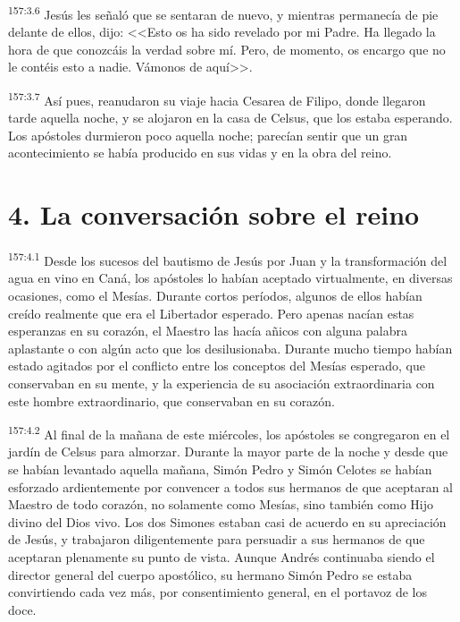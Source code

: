 \par 
\textsuperscript{157:3.6} Jesús les señaló que se sentaran de nuevo, y mientras permanecía de pie delante de ellos, dijo: <<Esto os ha sido revelado por mi Padre. Ha llegado la hora de que conozcáis la verdad sobre mí. Pero, de momento, os encargo que no le contéis esto a nadie. Vámonos de aquí>>.

\par 
\textsuperscript{157:3.7} Así pues, reanudaron su viaje hacia Cesarea de Filipo, donde llegaron tarde aquella noche, y se alojaron en la casa de Celsus, que los estaba esperando. Los apóstoles durmieron poco aquella noche; parecían sentir que un gran acontecimiento se había producido en sus vidas y en la obra del reino.

\section*{4. La conversación sobre el reino}
\par 
\textsuperscript{157:4.1} Desde los sucesos del bautismo de Jesús por Juan y la transformación del agua en vino en Caná, los apóstoles lo habían aceptado virtualmente, en diversas ocasiones, como el Mesías. Durante cortos períodos, algunos de ellos habían creído realmente que era el Libertador esperado. Pero apenas nacían estas esperanzas en su corazón, el Maestro las hacía añicos con alguna palabra aplastante o con algún acto que los desilusionaba. Durante mucho tiempo habían estado agitados por el conflicto entre los conceptos del Mesías esperado, que conservaban en su mente, y la experiencia de su asociación extraordinaria con este hombre extraordinario, que conservaban en su corazón.

\par 
\textsuperscript{157:4.2} Al final de la mañana de este miércoles, los apóstoles se congregaron en el jardín de Celsus para almorzar. Durante la mayor parte de la noche y desde que se habían levantado aquella mañana, Simón Pedro y Simón Celotes se habían esforzado ardientemente por convencer a todos sus hermanos de que aceptaran al Maestro de todo corazón, no solamente como Mesías, sino también como Hijo divino del Dios vivo. Los dos Simones estaban casi de acuerdo en su apreciación de Jesús, y trabajaron diligentemente para persuadir a sus hermanos de que aceptaran plenamente su punto de vista. Aunque Andrés continuaba siendo el director general del cuerpo apostólico, su hermano Simón Pedro se estaba convirtiendo cada vez más, por consentimiento general, en el portavoz de los doce.

